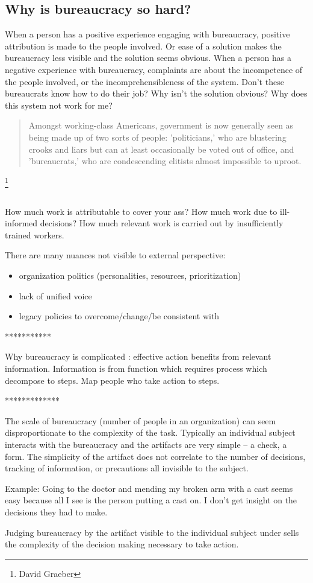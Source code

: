 \subsection{Why is bureaucracy so hard?}

When a person has a positive experience engaging with bureaucracy, positive attribution is made to the people involved. Or ease of a solution makes the bureaucracy less visible and the solution seems obvious. 
When a person has a negative experience with bureaucracy, complaints are about the incompetence of the people involved, or the incomprehensibleness of the system. Don't these bureaucrats know how to do their job? Why isn't the solution obvious? Why does this system not work for me?

\begin{quote}
 Amongst working-class Americans, government is now generally seen as being made up of two sorts of people: 'politicians,' who are blustering crooks and liars but can at least occasionally be voted out of office, and 'bureaucrats,' who are condescending elitists almost impossible to uproot.   
\end{quote}
\footnote{David Graeber}


\ \\


How much work is attributable to cover your ass? How much work due to ill-informed decisions? How much relevant work is carried out by insufficiently trained workers. 


There are many nuances not visible to external perspective:
\begin{itemize}
\item organization politics (personalities, resources, prioritization)
\item lack of unified voice
\item legacy policies to overcome/change/be consistent with
\end{itemize}

***********

Why bureaucracy is complicated : effective action benefits from relevant information. Information is from function which requires process which decompose to steps. Map people who take action to steps.

*************

The scale of bureaucracy (number of people in an organization) can seem disproportionate to the complexity of the task. Typically an individual subject interacts with the bureaucracy and the artifacts are very simple -- a check, a form. The simplicity of the artifact does not correlate to the number of decisions, tracking of information, or precautions all invisible to the subject.

Example: Going to the doctor and mending my broken arm with a cast seems easy because all I see is the person putting a cast on. I don't get insight on the decisions they had to make. 

Judging bureaucracy by the artifact visible to the individual subject under sells the complexity of the decision making necessary to take action.